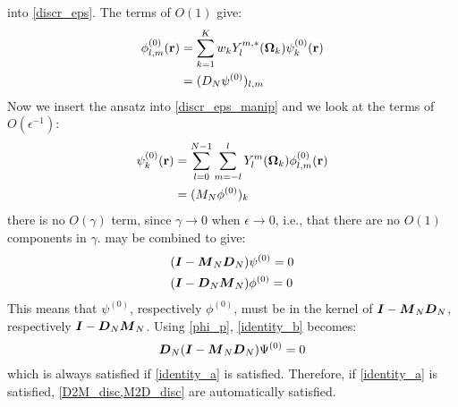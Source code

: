 into \cref{discr_eps}. The terms of $O(1)$ give:
\begin{equation}
\begin{split}
\phi_{l,m}^{(0)}(\br) &= \sum_{k=1}^K w_k Y_l^{m,*}(\bo_k) \psi_k^{(0)}(\br)\\ 
&= (D_N\psi^{(0)})_{l,m}
\end{split}
\label{D2M_disc}
\end{equation}
Now we insert the ansatz into \cref{discr_eps_manip} and we look at the terms
of $O(\epsilon^{-1})$:
\begin{equation}
\begin{split}
\psi_k^{(0)}(\br) &=\sum_{l=0}^{N-1} \sum_{m=-l}^l Y_l^m(\bo_k) 
\phi_{l,m}^{(0)}(\br)\\
&= (M_N\phi^{(0)})_k
\end{split}
\label{M2D_disc}
\end{equation}
there is no $O(\gamma)$ term, since $\gamma\rightarrow 0$ when 
$\epsilon\rightarrow 0$, i.e., that there are no
$O(1)$ components in $\gamma$.  may be combined to give:
\begin{align}
  &(\bs{I}-\bs{M}_N\bs{D}_N)\psi^{(0)} = 0 \label{identity_a}\\
  &(\bs{I}-\bs{D}_N\bs{M}_N)\phi^{(0)} = 0 \label{identity_b}
\end{align}
This means that $\psi^{(0)}$, respectively $\phi^{(0)}$, must be in the kernel
of $\boldsymbol{I}-\boldsymbol{M}_N \boldsymbol{D}_N$, respectively $\boldsymbol{I}-\boldsymbol{D}_N \boldsymbol{M}_N$. Using 
\cref{phi_p}, \cref{identity_b} becomes:
\begin{equation}
  \boldsymbol{D}_N(\boldsymbol{I}-\boldsymbol{M}_N \boldsymbol{D}_N)\Psi^{(0)} = 0
\end{equation}
which is always satisfied if \cref{identity_a} is satisfied.
Therefore, if \cref{identity_a} is satisfied, \cref{D2M_disc,M2D_disc} are
automatically satisfied.

